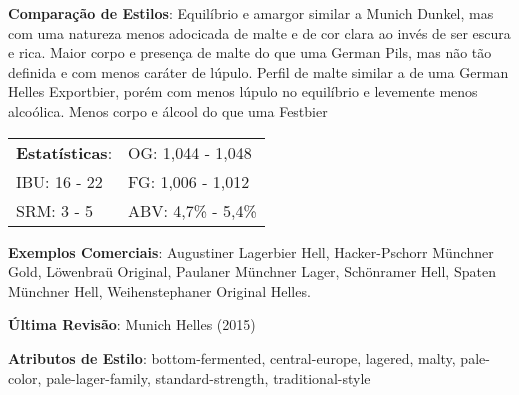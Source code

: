 \textbf{Comparação de Estilos}: Equilíbrio e amargor similar a Munich Dunkel, mas com uma natureza menos adocicada de malte e de cor clara ao invés de ser escura e rica. Maior corpo e presença de malte do que uma German Pils, mas não tão definida e com menos caráter de lúpulo. Perfil de malte similar a de uma German Helles Exportbier, porém com menos lúpulo no equilíbrio e levemente menos alcoólica. Menos corpo e álcool do que uma Festbier

\begin{tabular}{@{}p{35mm}p{35mm}@{}}
  \textbf{Estatísticas}: & OG: 1,044 - 1,048 \\
  IBU: 16 - 22  & FG: 1,006 - 1,012  \\
  SRM: 3 - 5   & ABV: 4,7\% - 5,4\%
\end{tabular}

\textbf{Exemplos Comerciais}: Augustiner Lagerbier Hell, Hacker-Pschorr Münchner Gold, Löwenbraü Original, Paulaner Münchner Lager, Schönramer Hell, Spaten Münchner Hell, Weihenstephaner Original Helles.

\textbf{Última Revisão}: Munich Helles (2015)

\textbf{Atributos de Estilo}: bottom-fermented, central-europe, lagered, malty, pale-color, pale-lager-family, standard-strength, traditional-style

